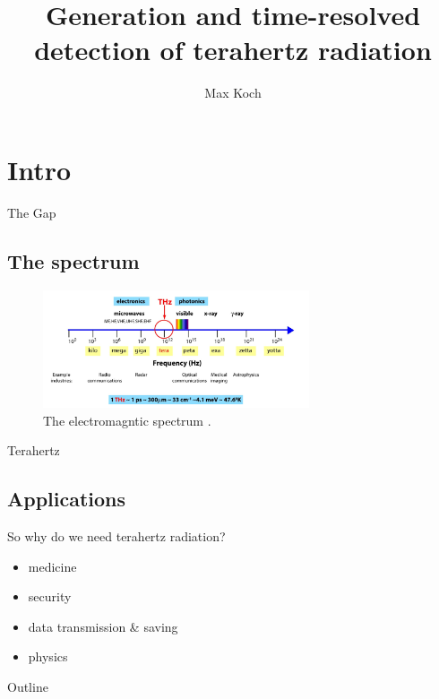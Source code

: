 \documentclass[aspectratio=1610, 9pt]{beamer}
\title{Generation and time-resolved detection of
terahertz radiation}
\author[M.~Koch]{Max Koch}
\institute[AG Wang]{Arbeitsgruppe Wang \\  Fakultät Physik}
\begin{document}
\maketitle

\section{Intro}

\begin{frame}{The Gap}
  \subsection{The spectrum}
  \begin{center}
    \begin{figure}
      \includegraphics[width=0.7\textwidth]{images/spectrum.png}
      \caption{The electromagntic spectrum \cite{spectrum_pic}.}
    \end{figure}
  \end{center}
\end{frame}


\begin{frame}{Terahertz}
  \subsection{Applications}
  So why do we need terahertz radiation?
  \begin{itemize}
    \item medicine \cite{THzgap_applications}
    \item security \cite{thz_explosive_detec}
    \item data transmission \& saving \cite{communication,datasaving}
    \item physics \cite{wiki_book}
  \end{itemize}

\end{frame}

\begin{frame}{Outline}
  \tableofcontents
\end{frame}
\end{document}
